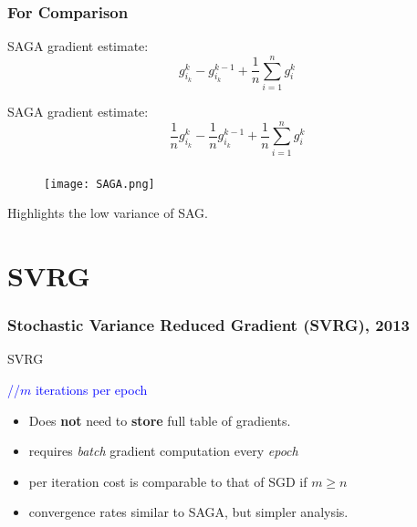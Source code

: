 \documentclass[aspectratio=149]{beamer}
\begin{document}
\begin{frame}
  \frametitle{For Comparison}
  SAGA gradient estimate:
  \begin{equation}
    g_{i_k}^k - g_{i_k}^{k-1} + \frac{1}{n}\sum_{i=1}^{n} g_i^k
  \end{equation}

  SAGA gradient estimate:
  \begin{equation}
    \frac{1}{n}g_{i_k}^k - \frac{1}{n}g_{i_k}^{k-1} + \frac{1}{n}\sum_{i=1}^{n} g_i^k
  \end{equation}

\end{frame}

\begin{frame}
  \frametitle{}

  \begin{figure}[ht]
    \centering
    \texttt{[image: SAGA.png]}
  \end{figure}
  Highlights the low variance of SAG.
\end{frame}


\section{SVRG}%

\begin{frame}
  \frametitle{Stochastic Variance Reduced Gradient (SVRG), 2013}

  \begin{algorithm}[H]
    \caption{SVRG}\label{}
    \begin{algorithmic}[1]
      \hfill \textcolor{blue}{//$m$ iterations per epoch}
      \EndFor{}
      \EndFor{}
    \end{algorithmic}
  \end{algorithm}

  \begin{itemize}
    \item Does \textbf{not} need to \textbf{store} full table of gradients.
    \item requires \emph{batch} gradient computation every \emph{epoch}
    \item per iteration cost is comparable to that of SGD if $m \ge n$
    \item convergence rates similar to SAGA, but simpler analysis.
  \end{itemize}
\end{frame}
\end{document}
